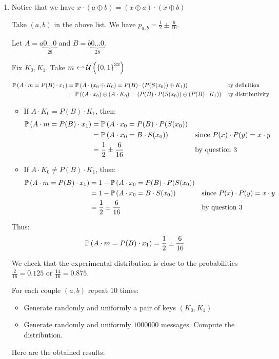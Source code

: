 \begin{enumerate}[label=\textbf{\arabic*})]
    \item
    Notice that we have $x \cdot (a \oplus b) = (x \oplus a)\cdot(x \oplus b)$

    Take $(a, b)$ in the above list. We have $p_{a, b} = \frac{1}{2} \pm \frac{6}{16}$.

    Let $A = a\underbrace{0\dots0}_{28}$ and $B = b\underbrace{0\dots0}_{28}$.

    Fix $K_0, K_1$. Take $m \hookleftarrow \mathcal{U}\left(\left\{ 0,1 \right\}^{32}\right)$

    \begin{align*}
        \mathbb{P}\left( A\cdot m = P(B)\cdot x_1 \right) &= \mathbb{P}\left( A\cdot (x_0 \oplus K_0) = P(B) \cdot (P(S(x_0))\oplus K_1) \right) && \text{by definition}\\
            &= \mathbb{P}\left( (A\cdot x_0) \oplus (A \cdot K_0) = (P(B) \cdot P(S(x_0)) \oplus (P(B) \cdot K_1) \right) && \text{by distributivity}\\
    \end{align*}

    \begin{itemize}
        \item If $A \cdot K_0 = P(B) \cdot K_1$, then:
        \begin{align*}
            \mathbb{P}\left( A\cdot m = P(B)\cdot x_1 \right) &= \mathbb{P}\left( A\cdot x_0 = P(B) \cdot P(S(x_0) \right)\\
                &= \mathbb{P}\left( A\cdot x_0 = B \cdot S(x_0) \right) && \text{since } P(x) \cdot P(y) = x \cdot y\\
                &= \frac{1}{2} \pm \frac{6}{16} && \text{by question 3}
        \end{align*}
        \item If $A \cdot K_0 \neq P(B) \cdot K_1$, then:
        \begin{align*}
            \mathbb{P}\left( A\cdot m = P(B)\cdot x_1 \right) &= 1-\mathbb{P}\left( A\cdot x_0 = P(B) \cdot P(S(x_0) \right)\\
                &= 1-\mathbb{P}\left( A\cdot x_0 = B \cdot S(x_0) \right) && \text{since } P(x) \cdot P(y) = x \cdot y\\
                &= \frac{1}{2} \pm \frac{6}{16} && \text{by question 3}
        \end{align*}
    \end{itemize}
    Thus:
    \[\mathbb{P}\left( A\cdot m = P(B)\cdot x_1 \right) = \frac{1}{2} \pm \frac{6}{16}\]

    We check that the experimental distribution is close to the probabilities $\frac{2}{16} = 0.125$ or $\frac{14}{16} = 0.875$.

    For each couple $(a, b)$ repeat $10$ times:
    \begin{itemize}
        \item Generate randomly and uniformly a pair of keys $(K_0, K_1)$.
        \item Generate randomly and uniformly $1000000$ messages. Compute the distribution.
    \end{itemize}
    Here are the obtained results:


\end{enumerate}
